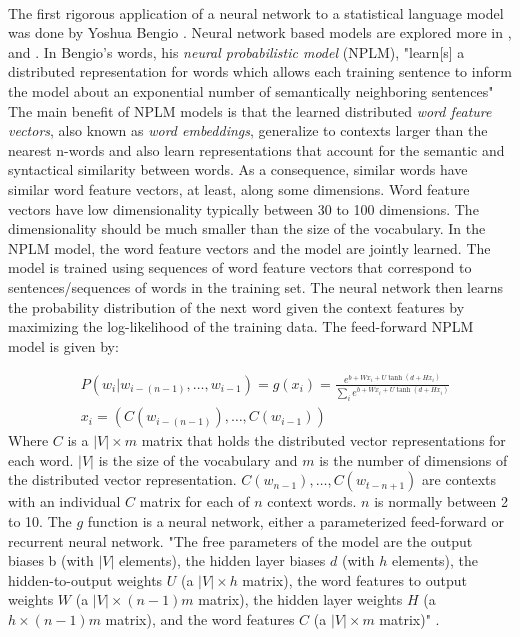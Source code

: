 \paragraph{}
The first rigorous application of a neural network to a statistical language model was done by Yoshua Bengio \cite{Bengio2003}. Neural network based models are explored more in \cite{Collobert2008}, and \cite{HuangEtAl2012} . In Bengio's words, his \emph{neural probabilistic model} (NPLM), "learn[s] a distributed representation for words which allows each training sentence to inform the model about an exponential number of semantically neighboring sentences" \cite[pg. 1137]{Bengio2003} The main benefit of NPLM models is that the learned distributed \emph{word feature vectors}, also known as \emph{word embeddings}, generalize to contexts larger than the nearest n-words and also learn representations that account for the semantic and syntactical similarity between words. As a consequence, similar words have similar word feature vectors, at least, along some dimensions. Word feature vectors have low dimensionality typically between 30 to 100 dimensions. The dimensionality should be much smaller than the size of the vocabulary. In the NPLM model, the word feature vectors and the model are jointly learned. The model is trained using sequences of word feature vectors that correspond to sentences/sequences of words in the training set. The neural network then learns the probability distribution of the next word given the context features by maximizing the log-likelihood of the training data. 
The feed-forward NPLM model is given by:

\begin{align}
&P(w_i | w_{i-(n-1)},\dots, w_{i-1}) = g(x_i) = \frac {e^{b+Wx_i+U \tanh(d+Hx_i)}} {\sum_i e^{b+Wx_i+U \tanh(d+Hx_i)}} \label{FFNN}
\\
&x_i=\left(C(w_{i-(n-1)}), \dots, C(w_{i-1}) \right) \nonumber
\end{align}
Where $C$ is a $|V|\times m$ matrix that holds the distributed vector representations for each word.  $|V|$ is the size of the vocabulary and $m$ is the number of dimensions of the distributed vector representation. $C(w_{n-1}), \dots, C(w_{t-n+1})$ are contexts with an individual $C$ matrix for each of $n$ context words. $n$ is normally between 2 to 10. The $g$ function is a neural network, either a parameterized feed-forward or recurrent neural network. 
"The free parameters of the model are the output biases b (with $|V|$ elements), the hidden layer biases $d$ (with $h$ elements), the hidden-to-output weights $U$ (a $|V| \times h$ matrix), the word features to output weights $W$ (a $|V| \times (n-1)m$ matrix), the hidden layer weights $H$ (a $h \times (n-1)m$ matrix), and the word features $C$ (a $|V| \times m$ matrix)" \cite[pg. 1143]{Bengio2003}.
